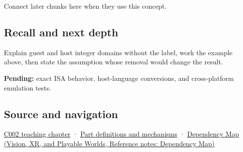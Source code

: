 Connect later chunks here when they use this concept.

\subsection{Recall and next depth}\label{appendix-33e7a011b684-recall-and-next-depth}

Explain guest and host integer domains without the label, work the example above, then state the assumption whose removal would change the result.

\textbf{Pending:} exact ISA behavior, host-language conversions, and cross-platform emulation tests.

\subsection{Source and navigation}\label{appendix-33e7a011b684-source-and-navigation}

\hyperref[01-foundations-i-ch001-arithmetic-becomes-a-policy]{C002 teaching chapter} · \hyperref[appendix-fd090d982a15]{Part definitions and mechanisms} · \href{../07-Vision-XR-and-Playable-Worlds/main.pdf\#nameddest=appendix-4ad47bdd269a}{Dependency Map (Vision, XR, and Playable Worlds, Reference notes: Dependency Map)}
